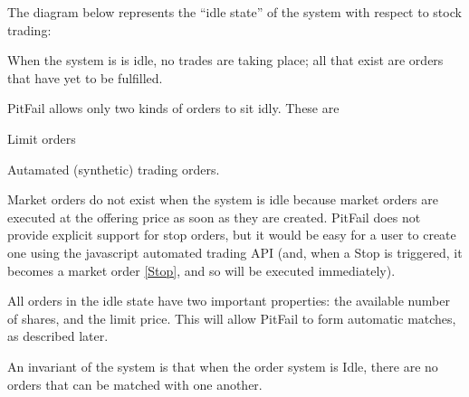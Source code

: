 \documentclass[a4]{article}
\begin{document}
The diagram below represents the ``idle state'' of the system with respect to
stock trading:
\begin{figure}
\noindent{}
\end{figure}

When the system is is idle, no trades are taking place; all that exist are
orders that have yet to be fulfilled.

PitFail allows only two kinds of orders to sit idly. These are
\setcounter{listcnt0}{0}
\begin{list}{.}
{
\setlength{\rightmargin}{\leftmargin}
}

\item Limit orders

\item Autamated (synthetic) trading orders.
\end{list}

Market orders do not exist when the system is idle because market orders are
executed at the offering price as soon as they are created. PitFail does not
provide explicit support for stop orders, but it would be easy for a user to
create one using the javascript automated trading API (and, when a Stop is
triggered, it becomes a market order \hyperlink{stop}{[Stop]}, and so will be executed
immediately).

All orders in the idle state have two important properties: the available
number of shares, and the limit price. This will allow PitFail to form
automatic matches, as described later.

An invariant of the system is that when the order system is Idle, there are no
orders that can be matched with one another.


\end{document}
